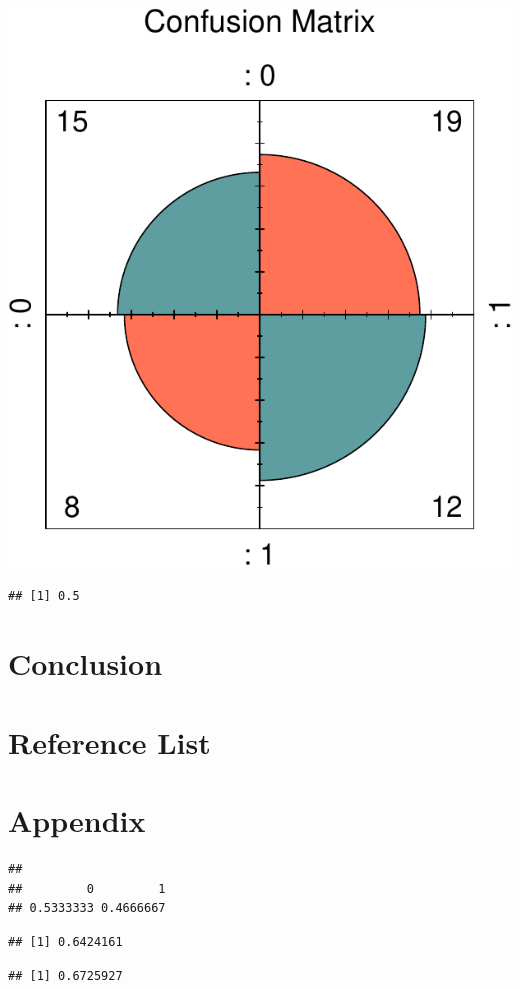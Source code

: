\documentclass[11pt,preprint, authoryear]{elsarticle}
\numberwithin{equation}{section}
\numberwithin{figure}{section}
\numberwithin{table}{section}
\begin{document}
\includegraphics{ML_change_files/figure-latex/unnamed-chunk-27-1.pdf}

\begin{verbatim}
## [1] 0.5
\end{verbatim}

\hypertarget{conclusion}{%
\section{Conclusion}\label{conclusion}}

\hypertarget{reference-list}{%
\section{Reference List}\label{reference-list}}

\hypertarget{appendix}{%
\section{Appendix}\label{appendix}}

\begin{verbatim}
## 
##         0         1 
## 0.5333333 0.4666667
\end{verbatim}

\begin{verbatim}
## [1] 0.6424161
\end{verbatim}

\begin{verbatim}
## [1] 0.6725927
\end{verbatim}


\end{document}
